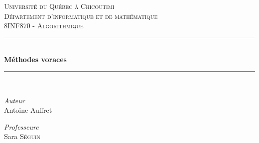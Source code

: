 \documentclass[french,12pt]{article} %
\begin{document}
	

\begin{titlepage} %
	\newcommand{\HRule}{\rule{\linewidth}{0.5mm}} %
	
	\center %
	
	
	\textsc{\LARGE Université du Québec à Chicoutimi}\\[1.5cm] %
	
	\textsc{\Large Département d'informatique et de mathématique}\\[0.5cm] %
	
	\textsc{\large 8INF870 - Algorithmique }\\[0.5cm] %
	
	
	\HRule\\[0.4cm]
	
	{\huge\bfseries Méthodes voraces }\\[0.4cm] %
	
	\HRule\\[1.5cm]
	
	

		\begin{center}
			\large
			\textit{Auteur}\\
			Antoine Auffret
		\end{center}


	
	{\large\textit{Professeure}}\\
	Sara \textsc{Séguin} %
	
	

\end{titlepage}
\end{document}
